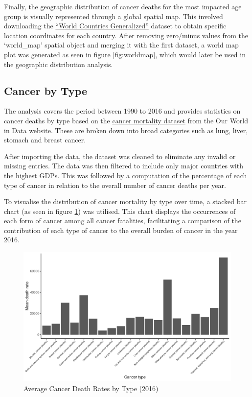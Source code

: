 \documentclass[11pt,a4paper,]{article}
\begin{document}
Finally, the geographic distribution of cancer deaths for the most impacted age group is visually represented through a global spatial map. This involved downloading the \href{https://hub.arcgis.com/datasets/esri::world-countries-generalized/explore?location=-0.131846\%2C0.000000\%2C2.00}{``World Countries Generalized''} dataset to obtain specific location coordinates for each country. After removing zero/minus values from the `world\_map' spatial object and merging it with the first dataset, a world map plot was generated as seen in figure \ref{fig:worldmap}, which would later be used in the geographic distribution analysis.

\hypertarget{cancer-by-type}{%
\subsection{Cancer by Type}\label{cancer-by-type}}

The analysis covers the period between 1990 to 2016 and provides statistics on cancer deaths by type based on the \href{https://ourworldindata.org/grapher/cancer-deaths-by-type-grouped}{cancer mortality dataset} from the Our World in Data website. These are broken down into broad categories such as lung, liver, stomach and breast cancer.

After importing the data, the dataset was cleaned to eliminate any invalid or missing entries. The data was then filtered to include only major countries with the highest GDPs. This was followed by a computation of the percentage of each type of cancer in relation to the overall number of cancer deaths per year.

To visualise the distribution of cancer mortality by type over time, a stacked bar chart (as seen in figure \ref{fig:dataadd}) was utilised. This chart displays the occurrences of each form of cancer among all cancer fatalities, facilitating a comparison of the contribution of each type of cancer to the overall burden of cancer in the year 2016.

\begin{figure}
\centering
\includegraphics{etc5513_assignment2_g1_t1_files/figure-latex/dataadd-1.pdf}
\caption{\label{fig:dataadd}Average Cancer Death Rates by Type (2016)}
\end{figure}
\end{document}
